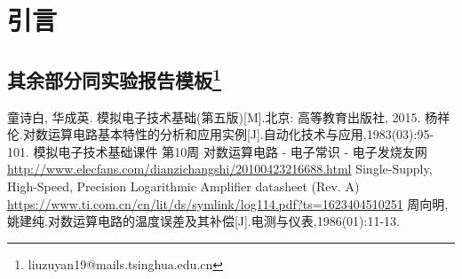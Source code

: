 \documentclass[UTF8]{ctexart}  %
\begin{document}
\newpage

\section{引言}

\subsection{其余部分同实验报告模板\footnote{liuzuyan19@mails.tsinghua.edu.cn}}


\newpage

\begin{thebibliography}{}
    童诗白, 华成英. 模拟电子技术基础(第五版)[M].北京: 高等教育出版社, 2015.
    杨祥伦.对数运算电路基本特性的分析和应用实例[J].自动化技术与应用,1983(03):95-101.
    模拟电子技术基础课件 第10周
    对数运算电路 - 电子常识 - 电子发烧友网\\\url{http://www.elecfans.com/dianzichangshi/20100423216688.html}
    Single-Supply, High-Speed, Precision Logarithmic Amplifier datasheet (Rev. A)\\\url{https://www.ti.com.cn/cn/lit/ds/symlink/log114.pdf?ts=1623404510251}
    周向明,姚建纯.对数运算电路的温度误差及其补偿[J].电测与仪表,1986(01):11-13.
\end{thebibliography}
\end{document}
